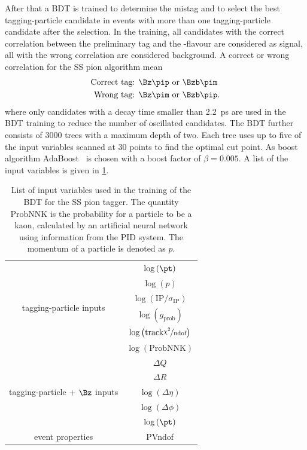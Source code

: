 After that a BDT is trained to determine the mistag and to select the best tagging-particle candidate in events with more than one tagging-particle candidate after the selection.
In the training, all candidates with the correct correlation between the preliminary tag and the \B-flavour are considered as signal, all with the wrong correlation are considered background.
A correct or wrong correlation for the SS pion algorithm mean
\begin{align*}
	\text{Correct tag: }& \Bz\pip \text{ or } \Bzb\pim\\
	\text{Wrong tag: }& \Bz\pim \text{ or } \Bzb\pip.
\end{align*}
where only \B candidates with a decay time smaller than \SI{2.2}{\pico\second} are used in the BDT training to reduce the number of oscillated \B candidates.
The BDT further consists of \num{3000} trees with a maximum depth of two.
Each tree uses up to five of the input variables scanned at 30 points to find the optimal cut point.
As boost algorithm AdaBoost~\cite{AdaBoost} is chosen with a boost factor of $\beta=0.005$.
A list of the input variables is given in \cref{tab:BDTInputSSPion}.
\begin{table}[tbp]
	\centering
	\caption{List of input variables used in the training of the BDT for the SS pion tagger.
	The quantity $\mathrm{ProbNNK}$ is the probability for a particle to be a kaon, calculated by an artificial neural network using information from the \lhcb PID system.
	The momentum of a particle is denoted as $p$.}
	\begin{tabular}{cc}
		\toprule
		\multirow{6}{*}{tagging-particle inputs} 	& $\log\left(\pt\right)$ \\
													& $\log\left(p\right)$ \\
													& $\log\left(\text{IP}/\sigma_\text{IP}\right)$\\
													& $\log\left(g_\text{prob}\right)$\\
													& $\log\left(\text{track} \nicefrac{\chi^2}{\text{ndof}}\right)$ \\
													& $\log\left(\text{ProbNNK}\right)$\\
		\midrule
		\multirow{5}{*}{tagging-particle + $\Bz$ inputs}	& $\Delta Q$\\
															& $\Delta R$\\
															& $\log\left(\Delta\eta\right)$\\
															& $\log\left(\Delta\phi\right)$\\
															& $\log\left(\pt\right)$\\
		\midrule
		\multirow{1}{*}{event properties}	& PVndof\\
		\bottomrule
	\end{tabular}
	\label{tab:BDTInputSSPion}
\end{table}
